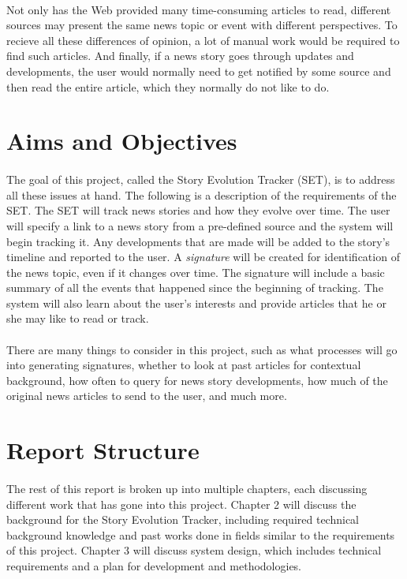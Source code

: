 \documentclass[11pt,titlepage]{report}
\begin{document}
\paragraph{}
Not only has the Web provided many time-consuming articles to read, different sources may present the same news topic or event with different perspectives. To recieve all these differences of opinion, a lot of manual work would be required to find such articles. And finally, if a news story goes through updates and developments, the user would normally need to get notified by some source and then read the entire article, which they normally do not like to do.
\section{Aims and Objectives}
\paragraph{}
The goal of this project, called the Story Evolution Tracker (SET), is to address all these issues at hand. The following is a description of the requirements of the SET. The SET will track news stories and how they evolve over time. The user will specify a link to a news story from a pre-defined source and the system will begin tracking it. Any developments that are made will be added to the story's timeline and reported to the user. A \textit{signature} will be created for identification of the news topic, even if it changes over time. The signature will include a basic summary of all the events that happened since the beginning of tracking. The system will also learn about the user's interests and provide articles that he or she may like to read or track.
\paragraph{}
There are many things to consider in this project, such as what processes will go into generating signatures, whether to look at past articles for contextual background, how often to query for news story developments, how much of the original news articles to send to the user, and much more. 
\section{Report Structure}
\paragraph{}
The rest of this report is broken up into multiple chapters, each discussing different work that has gone into this project. Chapter 2 will discuss the background for the Story Evolution Tracker, including required technical background knowledge and past works done in fields similar to the requirements of this project. Chapter 3 will discuss system design, which includes technical requirements and a plan for development and methodologies. 
\end{document}

